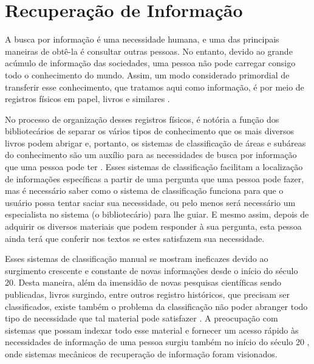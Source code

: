 \section{Recuperação de Informação} \label{sec:RecuperaçãoInformação}



    A busca por informação é uma necessidade humana, e uma das principais maneiras de obtê-la é consultar outras pessoas.
    No entanto, devido ao grande acúmulo de informação das sociedades, uma pessoa não pode carregar consigo todo o conhecimento do mundo.
    Assim, um modo considerado primordial de transferir esse conhecimento, que tratamos aqui como informação, é por meio de registros físicos em papel, livros e similares \cite[p.~1]{Grossman2004IRAH}.
    
    No processo de organização desses registros físicos, é notória a função dos bibliotecários de separar os vários tipos de conhecimento que os mais diversos livros podem abrigar e, portanto, os sistemas de classificação de áreas e subáreas do conhecimento são um auxílio para as necessidades de busca por informação que uma pessoa pode ter \cite[p.~1]{Manning2008IIR} \cite[p.~1446]{Sanderson2012THIRR} \cite[p.~6]{Baeza-Yates1999}. 
    Esses sistemas de classificação facilitam a localização de informações específicas a partir de uma pergunta que uma pessoa pode fazer, mas é necessário saber como o sistema de classificação funciona para que o usuário possa tentar saciar sua necessidade, ou pelo menos será necessário um especialista no sistema (o bibliotecário) para lhe guiar.
    E mesmo assim, depois de adquirir os diversos materiais que podem responder à sua pergunta, esta pessoa ainda terá que conferir nos textos se estes satisfazem sua necessidade.
    
    
    Esses sistemas de classificação manual se mostram ineficazes devido ao surgimento crescente e constante de novas informações \cite[p.~6]{Baeza-Yates1999} desde o início do século 20. 
    Desta maneira, além da imensidão de novas pesquisas científicas sendo publicadas, livros surgindo, entre outros registro históricos, que precisam ser classificados, existe também o problema da classificação não poder abranger todo tipo de necessidade que tal material pode satisfazer \cite[p.~1444]{Sanderson2012THIRR}. 
    A preocupação com sistemas que possam indexar todo esse material e fornecer um acesso rápido às necessidades de informação de uma pessoa surgiu também no início do século 20 \cite{Bush:1979:WMT:1113634.1113638}, onde sistemas mecânicos de recuperação de informação foram visionados.
    
